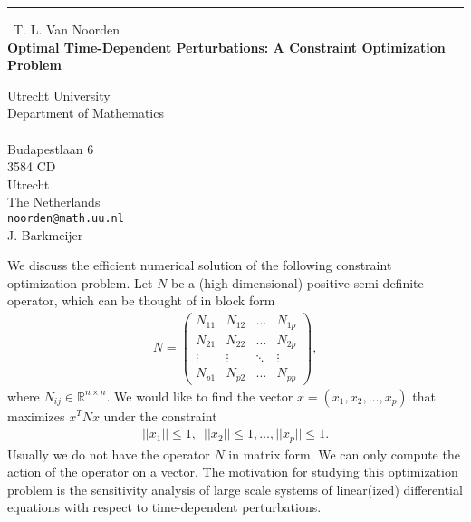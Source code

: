 \documentclass{report}
\begin{document}
\begin{center}
\rule{6in}{1pt} \
{\large T. L. Van Noorden \\
{\bf Optimal Time-Dependent Perturbations: A Constraint Optimization Problem}}

Utrecht University \\ Department of Mathematics \\ \\ Budapestlaan 6 \\ 3584 CD \\ Utrecht \\ The Netherlands
\\
{\tt noorden@math.uu.nl}\\
J. Barkmeijer\end{center}

We discuss the efficient numerical solution of the following
constraint optimization problem.
Let $N$ be a (high dimensional) positive semi-definite operator, which can
be thought of in block form
\begin{eqnarray}
N=\left ( \begin{array}{cccc} N_{11} & N_{12} & \hdots & N_{1p} \\
N_{21} & N_{22} & \hdots & N_{2p} \\
\vdots & \vdots & \ddots & \vdots \\
N_{p1} & N_{p2} & \hdots & N_{pp} \end{array} \right ),
\end{eqnarray}
where $N_{ij}\in \mathbb{R}^{n\times n}$. We would like to find the vector
$x=(x_1,x_2,\hdots,x_p)$ that maximizes $x^TNx$ under the constraint
\begin{eqnarray}
||x_1||\leq 1,\,\,\,||x_2||\leq 1,\hdots,||x_p||\leq 1.
\end{eqnarray}
Usually we do not have the operator $N$ in matrix form. We can only
compute the action of the operator on a vector.
The motivation for studying this optimization problem is the
sensitivity analysis of large scale
systems of linear(ized) differential equations with respect
to time-dependent perturbations.
\end{document}
